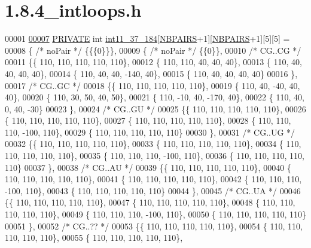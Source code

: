 \hypertarget{1_88_84__intloops_8h_source}{}\section{1.8.4\+\_\+intloops.h}
\label{1_88_84__intloops_8h_source}

\begin{DoxyCode}
00001 
\mbox{\hyperlink{1_88_84__intloops_8h_a858aec0a577299de741b612aa2f38cb3}{00007}} \mbox{\hyperlink{edit__cost_8h_a5e151c615eda34903514212f05a5ccf8}{PRIVATE}} \textcolor{keywordtype}{int} \mbox{\hyperlink{1_88_84__intloops_8h_a858aec0a577299de741b612aa2f38cb3}{int11\_37\_184}}[\mbox{\hyperlink{1_88_84__epars_8h_a5e75221c779d618eab81e096f37e32ce}{NBPAIRS}}+1][\mbox{\hyperlink{1_88_84__epars_8h_a5e75221c779d618eab81e096f37e32ce}{NBPAIRS}}+1][5][5] =
00008 \{ \textcolor{comment}{/* noPair */} \{\{\{0\}\}\},
00009 \{ \textcolor{comment}{/* noPair */} \{\{0\}\},
00010 \textcolor{comment}{/* CG..CG */}
00011 \{\{ 110, 110, 110, 110, 110\},
00012 \{ 110, 110,  40,  40,  40\},
00013 \{ 110,  40,  40,  40,  40\},
00014 \{ 110,  40,  40, -140,  40\},
00015 \{ 110,  40,  40,  40,  40\}
00016 \},
00017 \textcolor{comment}{/* CG..GC */}
00018 \{\{ 110, 110, 110, 110, 110\},
00019 \{ 110,  40, -40,  40,  40\},
00020 \{ 110,  30,  50,  40,  50\},
00021 \{ 110, -10,  40, -170,  40\},
00022 \{ 110,  40,   0,  40, -30\}
00023 \},
00024 \textcolor{comment}{/* CG..GU */}
00025 \{\{ 110, 110, 110, 110, 110\},
00026 \{ 110, 110, 110, 110, 110\},
00027 \{ 110, 110, 110, 110, 110\},
00028 \{ 110, 110, 110, -100, 110\},
00029 \{ 110, 110, 110, 110, 110\}
00030 \},
00031 \textcolor{comment}{/* CG..UG */}
00032 \{\{ 110, 110, 110, 110, 110\},
00033 \{ 110, 110, 110, 110, 110\},
00034 \{ 110, 110, 110, 110, 110\},
00035 \{ 110, 110, 110, -100, 110\},
00036 \{ 110, 110, 110, 110, 110\}
00037 \},
00038 \textcolor{comment}{/* CG..AU */}
00039 \{\{ 110, 110, 110, 110, 110\},
00040 \{ 110, 110, 110, 110, 110\},
00041 \{ 110, 110, 110, 110, 110\},
00042 \{ 110, 110, 110, -100, 110\},
00043 \{ 110, 110, 110, 110, 110\}
00044 \},
00045 \textcolor{comment}{/* CG..UA */}
00046 \{\{ 110, 110, 110, 110, 110\},
00047 \{ 110, 110, 110, 110, 110\},
00048 \{ 110, 110, 110, 110, 110\},
00049 \{ 110, 110, 110, -100, 110\},
00050 \{ 110, 110, 110, 110, 110\}
00051 \},
00052 \textcolor{comment}{/* CG..?? */}
00053 \{\{ 110, 110, 110, 110, 110\},
00054 \{ 110, 110, 110, 110, 110\},
00055 \{ 110, 110, 110, 110, 110\},

\end{DoxyCode}
